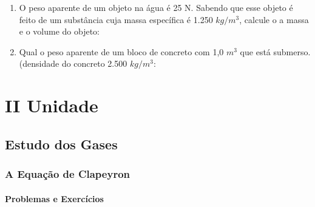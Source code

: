 \documentclass[12pt,a4paper]{book}
\begin{document}
\begin{enumerate}
		\item O peso aparente de um objeto na água é 25 N. Sabendo que esse objeto é feito de um substância cuja massa específica é 1.250 $kg/m^3$, calcule o a massa e o volume do objeto: 
		
		\item Qual o peso aparente de um bloco de concreto com 1,0 $m^3$ que está submerso. (densidade do concreto 2.500 $kg/m^3$:
				
\end{enumerate}		
	

\part*{II Unidade}
\chapter{Estudo dos Gases}

	\section{A Equação de Clapeyron}

		\newpage \subsection{Problemas e Exercícios}
		
\end{document}
